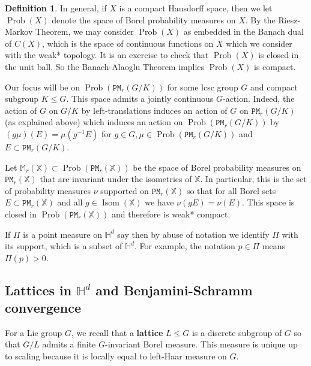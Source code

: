 \documentclass[11pt]{amsart}
\theoremstyle{definition}
\newtheorem{definition}[theorem]{Definition}
\theoremstyle{remark}
\renewcommand{\H}{\mathbb{H}}
\newcommand{\M}{\mathbb{M}}
\newcommand{\bX}{\mathbb{X}}
\newcommand{\cP}{\mathtt{PM}}
\newcommand{\Isom}{\operatorname{Isom}}
\newcommand{\Prob}{\operatorname{Prob}}
\begin{document}
\begin{definition}
In general, if $X$ is a compact Hausdorff space, then we let $\Prob(X)$ denote the space of Borel probability measures on $X$. By the Riesz-Markov Theorem, we may consider $\Prob(X)$ as embedded in the Banach dual of $C(X)$, which is the space of continuous functions on $X$ which we consider with the weak* topology. It is an exercise to check that $\Prob(X)$ is closed in the unit ball.  So the Banach-Alaoglu Theorem implies $\Prob(X)$ is compact.



Our focus will be on $\Prob(\cP_r(G/K))$ for some lcsc group $G$ and compact subgroup $K\le G$. This space admits a jointly continuous $G$-action. Indeed, the action of $G$ on $G/K$ by left-translations induces an action of $G$ on $\cP_r(G/K)$ (as explained above) which induces an action on $\Prob(\cP_r(G/K))$ by $(g\mu)(E)=\mu(g^{-1}E)$ for $g\in G, \mu \in \Prob(\cP_r(G/K))$ and $E\subset \cP_r(G/K)$. 
\end{definition}




Let $\M_r(\bX)\subset \Prob(\cP_r(\bX))$ be the space of Borel probability measures on $\cP_r(\bX)$ that are invariant under the isometries of $\bX$.  In particular, this is the set of probability measures $\nu$ supported on $\cP_r(\bX)$ so that for all Borel sets $E \subset \cP_r(\bX)$ and all $g \in \Isom(\bX)$ we have $\nu(gE) =\nu(E)$. This space is closed in $\Prob(\cP_r(\bX))$ and therefore is weak* compact. 




If $\Pi$ is a point measure on $\H^d$ say then by abuse of notation we identify $\Pi$ with its support, which is a subset of $\H^d$. For example, the notation $p \in \Pi$ means $\Pi(p)>0$. 

\subsection{Lattices in \texorpdfstring{$\H^d$}{H^d} and Benjamini-Schramm convergence}

For a Lie group $G$, we recall that a \textbf{lattice} $L \leq G$ is a discrete subgroup of $G$ so that $G/L$ admits a finite $G$-invariant Borel measure. This measure is unique up to scaling because it is locally equal to left-Haar measure on $G$. 
\end{document}
